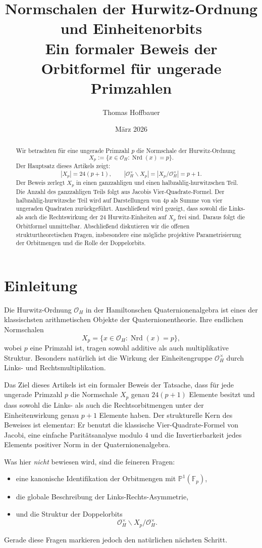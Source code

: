 \documentclass[12pt,a4paper]{article}
\title{\textbf{Normschalen der Hurwitz-Ordnung und Einheitenorbits}\\
	\large Ein formaler Beweis der Orbitformel für ungerade Primzahlen}
\author{Thomas Hoffbauer}
\date{März 2026}
\theoremstyle{plain}
\theoremstyle{definition}
\theoremstyle{remark}
\newcommand{\OH}{\mathcal O_H}
\newcommand{\Fp}{\mathbb F_p}
\newcommand{\PP}{\mathbb P}
\newcommand{\nrd}{\operatorname{Nrd}}
\begin{document}
	
	\maketitle
	
	\begin{abstract}
		Wir betrachten für eine ungerade Primzahl \(p\) die Normschale der Hurwitz-Ordnung
		\[
		X_p:=\{x\in \OH:\nrd(x)=p\}.
		\]
		Der Hauptsatz dieses Artikels zeigt:
		\[
		|X_p|=24(p+1),
		\qquad
		|\OH^\times\backslash X_p|=|X_p/\OH^\times|=p+1.
		\]
		Der Beweis zerlegt \(X_p\) in einen ganzzahligen und einen halbzahlig-hurwitzschen Teil. Die Anzahl des ganzzahligen Teils folgt aus Jacobis Vier-Quadrate-Formel. Der halbzahlig-hurwitzsche Teil wird auf Darstellungen von \(4p\) als Summe von vier ungeraden Quadraten zurückgeführt. Anschließend wird gezeigt, dass sowohl die Links- als auch die Rechtswirkung der \(24\) Hurwitz-Einheiten auf \(X_p\) frei sind. Daraus folgt die Orbitformel unmittelbar. Abschließend diskutieren wir die offenen strukturtheoretischen Fragen, insbesondere eine mögliche projektive Parametrisierung der Orbitmengen und die Rolle der Doppelorbits.
	\end{abstract}
	
	\section{Einleitung}
	
	Die Hurwitz-Ordnung \(\OH\) in der Hamiltonschen Quaternionenalgebra ist eines der klassischsten arithmetischen Objekte der Quaternionentheorie. Ihre endlichen Normschalen
	\[
	X_p=\{x\in\OH:\nrd(x)=p\},
	\]
	wobei \(p\) eine Primzahl ist, tragen sowohl additive als auch multiplikative Struktur. Besonders natürlich ist die Wirkung der Einheitengruppe \(\OH^\times\) durch Links- und Rechtsmultiplikation.
	
	Das Ziel dieses Artikels ist ein formaler Beweis der Tatsache, dass für jede ungerade Primzahl \(p\) die Normschale \(X_p\) genau \(24(p+1)\) Elemente besitzt und dass sowohl die Links- als auch die Rechtsorbitmengen unter der Einheitenwirkung genau \(p+1\) Elemente haben. Der strukturelle Kern des Beweises ist elementar: Er benutzt die klassische Vier-Quadrate-Formel von Jacobi, eine einfache Paritätsanalyse modulo \(4\) und die Invertierbarkeit jedes Elements positiver Norm in der Quaternionenalgebra.
	
	Was hier \emph{nicht} bewiesen wird, sind die feineren Fragen:
	\begin{itemize}
		\item eine kanonische Identifikation der Orbitmengen mit \(\PP^1(\Fp)\),
		\item die globale Beschreibung der Links-Rechts-Asymmetrie,
		\item und die Struktur der Doppelorbits
		\[
		\OH^\times\backslash X_p/\OH^\times.
		\]
	\end{itemize}
	Gerade diese Fragen markieren jedoch den natürlichen nächsten Schritt.
	
\end{document}
